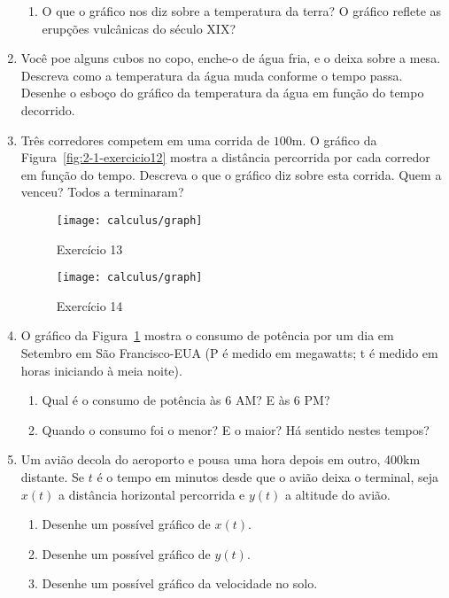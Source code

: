 \begin{enumerate}[label=\textbf{\arabic*.},leftmargin=*]
\begin{enumerate}
    \item O que o gráfico nos diz sobre a temperatura da terra? O gráfico reflete as erupções vulcânicas do século XIX?
  \end{enumerate}
  \item[\difficultQuestion] Você poe alguns cubos no copo, enche-o de água fria, e o deixa sobre a mesa. Descreva como a temperatura da água muda conforme o tempo passa. Desenhe o esboço do gráfico da temperatura da água em função do tempo decorrido.
  \item Três corredores competem em uma corrida de $100\si{\meter}$. O gráfico da Figura~\ref{fig:2-1-exercicio12} mostra a distância percorrida por cada corredor em função do tempo. Descreva o que o gráfico diz sobre esta corrida. Quem a venceu? Todos a terminaram?
  \begin{figure}[!ht]
    \centering
    \begin{minipage}{0.49\columnwidth}
      \texttt{[image: calculus/graph]}
      \caption{Exercício 13}
      \label{fig:2-1-exercicio12}
    \end{minipage}
    \begin{minipage}{0.49\columnwidth}
      \texttt{[image: calculus/graph]}
      \caption{Exercício 14}
      \label{fig:2-1-exercicio13}
    \end{minipage}
  \end{figure}
  \item O gráfico da Figura~\ref{fig:2-1-exercicio13} mostra o consumo de potência por um dia em Setembro em São Francisco-EUA (P é medido em megawatts; t é medido em horas iniciando à meia noite).
  \begin{enumerate}
    \item Qual é o consumo de potência às 6 AM? E às 6 PM?
    \item Quando o consumo foi o menor? E o maior? Há sentido nestes tempos?
  \end{enumerate}
  \item Um avião decola do aeroporto e pousa uma hora depois em outro, 400$\si\km$ distante. Se $t$ é o tempo em minutos desde que o avião deixa o terminal, seja $x(t)$ a distância horizontal percorrida e $y(t)$ a altitude do avião.
  \begin{enumerate}
    \item Desenhe um possível gráfico de $x(t)$.
    \item Desenhe um possível gráfico de $y(t)$.
    \item Desenhe um possível gráfico da velocidade no solo.

\end{enumerate}
\end{enumerate}
